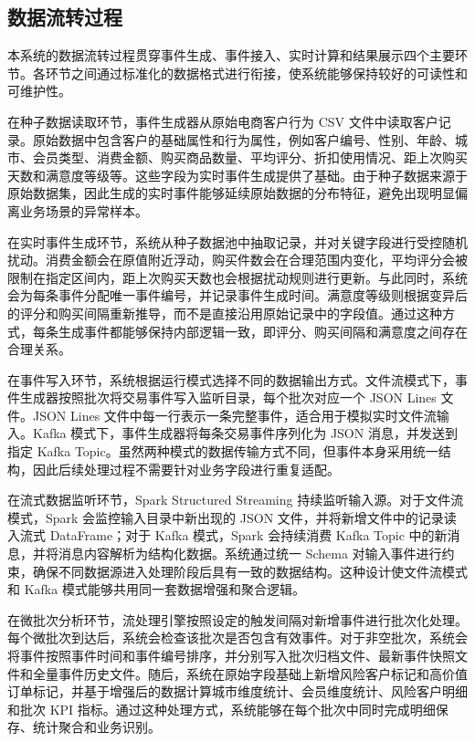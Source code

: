 \documentclass[12pt,hyperref,a4paper,UTF8]{ctexart}
\begin{document}
\subsection{数据流转过程}

本系统的数据流转过程贯穿事件生成、事件接入、实时计算和结果展示四个主要环节。各环节之间通过标准化的数据格式进行衔接，使系统能够保持较好的可读性和可维护性。

在种子数据读取环节，事件生成器从原始电商客户行为 CSV 文件中读取客户记录。原始数据中包含客户的基础属性和行为属性，例如客户编号、性别、年龄、城市、会员类型、消费金额、购买商品数量、平均评分、折扣使用情况、距上次购买天数和满意度等级等。这些字段为实时事件生成提供了基础。由于种子数据来源于原始数据集，因此生成的实时事件能够延续原始数据的分布特征，避免出现明显偏离业务场景的异常样本。

在实时事件生成环节，系统从种子数据池中抽取记录，并对关键字段进行受控随机扰动。消费金额会在原值附近浮动，购买件数会在合理范围内变化，平均评分会被限制在指定区间内，距上次购买天数也会根据扰动规则进行更新。与此同时，系统会为每条事件分配唯一事件编号，并记录事件生成时间。满意度等级则根据变异后的评分和购买间隔重新推导，而不是直接沿用原始记录中的字段值。通过这种方式，每条生成事件都能够保持内部逻辑一致，即评分、购买间隔和满意度之间存在合理关系。

在事件写入环节，系统根据运行模式选择不同的数据输出方式。文件流模式下，事件生成器按照批次将交易事件写入监听目录，每个批次对应一个 JSON Lines 文件。JSON Lines 文件中每一行表示一条完整事件，适合用于模拟实时文件流输入。Kafka 模式下，事件生成器将每条交易事件序列化为 JSON 消息，并发送到指定 Kafka Topic。虽然两种模式的数据传输方式不同，但事件本身采用统一结构，因此后续处理过程不需要针对业务字段进行重复适配。

在流式数据监听环节，Spark Structured Streaming 持续监听输入源。对于文件流模式，Spark 会监控输入目录中新出现的 JSON 文件，并将新增文件中的记录读入流式 DataFrame；对于 Kafka 模式，Spark 会持续消费 Kafka Topic 中的新消息，并将消息内容解析为结构化数据。系统通过统一 Schema 对输入事件进行约束，确保不同数据源进入处理阶段后具有一致的数据结构。这种设计使文件流模式和 Kafka 模式能够共用同一套数据增强和聚合逻辑。

在微批次分析环节，流处理引擎按照设定的触发间隔对新增事件进行批次化处理。每个微批次到达后，系统会检查该批次是否包含有效事件。对于非空批次，系统会将事件按照事件时间和事件编号排序，并分别写入批次归档文件、最新事件快照文件和全量事件历史文件。随后，系统在原始字段基础上新增风险客户标记和高价值订单标记，并基于增强后的数据计算城市维度统计、会员维度统计、风险客户明细和批次 KPI 指标。通过这种处理方式，系统能够在每个批次中同时完成明细保存、统计聚合和业务识别。
\end{document}
